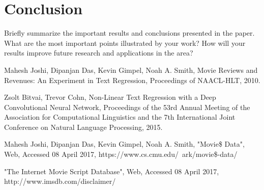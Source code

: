 \documentclass[11pt]{article}
\begin{document}
\section{Conclusion}
Briefly summarize the important results and conclusions presented in the paper. What are
the most important points illustrated by your work? How will your results improve future
research and applications in the area?

\begin{thebibliography}{9}

  Mahesh Joshi, Dipanjan Das, Kevin Gimpel, Noah A. Smith,
  Movie Reviews and Revenues: An Experiment in Text Regression,
  Proceedings of NAACL-HLT,
  2010.
  
    Zsolt Bitvai, Trevor Cohn,
    Non-Linear Text Regression with a Deep Convolutional Neural Network,
    Proceedings of the 53rd Annual Meeting of the Association for Computational Linguistics
    and the 7th International Joint Conference on Natural Language Processing,
    2015.
    
  Mahesh Joshi, Dipanjan Das, Kevin Gimpel, Noah A. Smith,
  "Movie\$ Data",
  Web,
  Accessed 08 April 2017,
  https://www.cs.cmu.edu/~ark/movie\$-data/

    "The Internet Movie Script Database",
    Web,
    Accessed 08 April 2017,
    http://www.imsdb.com/disclaimer/
  
\end{thebibliography}
\end{document}

